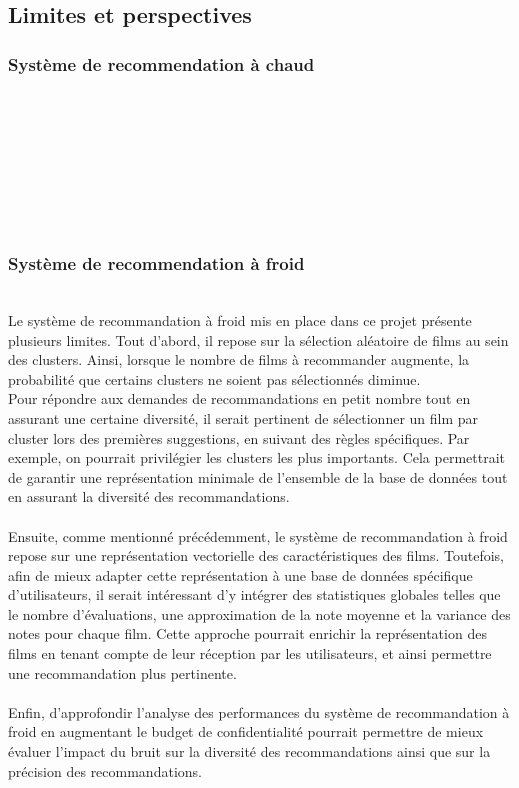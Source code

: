 \documentclass{article}
\begin{document}
    \subsection{Limites et perspectives}
    \subsubsection{Système de recommendation à chaud}
    $ $\\
    \\
    \\
    \\
    \\
    \\
    \\

\subsubsection{Système de recommendation à froid}
    $ $\\
    Le système de recommandation à froid mis en place dans ce projet présente plusieurs limites. 
    Tout d’abord, il repose sur la sélection aléatoire de films au sein des clusters. Ainsi, lorsque 
    le nombre de films à recommander augmente, la probabilité que certains clusters ne soient pas sélectionnés diminue.\\
    Pour répondre aux demandes de recommandations en petit nombre tout en assurant une certaine diversité, il serait pertinent 
    de sélectionner un film par cluster lors des premières suggestions, en suivant des règles spécifiques. Par exemple, on 
    pourrait privilégier les clusters les plus importants. Cela permettrait de garantir une représentation minimale de l’ensemble 
    de la base de données tout en assurant la diversité des recommandations.\\
    \\
    Ensuite, comme mentionné précédemment, le système de recommandation à froid repose sur une représentation 
    vectorielle des caractéristiques des films. Toutefois, afin de mieux adapter cette représentation 
    à une base de données spécifique d’utilisateurs, il serait intéressant d’y intégrer des 
    statistiques globales telles que le nombre d’évaluations, une approximation de la note moyenne 
    et la variance des notes pour chaque film. Cette approche pourrait enrichir la représentation 
    des films en tenant compte de leur réception par les utilisateurs, et ainsi permettre une recommandation plus pertinente.\\
    \\
    Enfin, d'approfondir l'analyse des performances du système de recommandation à froid en augmentant le budget de confidentialité
    pourrait permettre de mieux évaluer l'impact du bruit sur la diversité des recommandations ainsi que sur la précision des recommandations.
\end{document}
